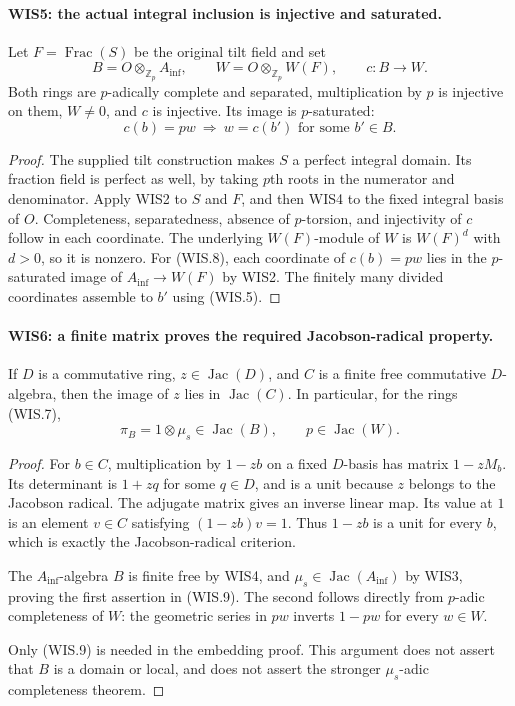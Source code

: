 \paragraph{WIS5: the actual integral inclusion is injective and saturated.}
\label{claim:WIS5}
Let $F=\operatorname{Frac}(S)$ be the original tilt field and set
\[
 B=O\otimes_{\mathbb Z_p}A_{\inf},\qquad
 W=O\otimes_{\mathbb Z_p}W(F),\qquad c:B\longrightarrow W.
                                                               \tag{WIS.7}
\]
Both rings are $p$-adically complete and separated, multiplication
by $p$ is injective on them, $W\ne0$, and $c$ is injective.
Its image is $p$-saturated:
\[
                  c(b)=pw\ \Longrightarrow\
                        w=c(b')\text{ for some }b'\in B.   \tag{WIS.8}
\]

\begin{proof}
The supplied tilt construction makes $S$ a perfect integral
domain. Its fraction field is perfect as well, by taking
$p$th roots in the numerator and denominator. Apply WIS2
to $S$ and $F$, and then WIS4 to the fixed integral basis
of $O$. Completeness, separatedness, absence of $p$-torsion,
and injectivity of $c$ follow in each coordinate.
The underlying $W(F)$-module of $W$ is $W(F)^d$ with
$d>0$, so it is nonzero. For (WIS.8), each coordinate
of $c(b)=pw$ lies in the $p$-saturated image of
$A_{\inf}\to W(F)$ by WIS2. The finitely many divided
coordinates assemble to $b'$ using (WIS.5).
\end{proof}

\paragraph{WIS6: a finite matrix proves the required Jacobson-radical property.}
\label{claim:WIS6}
If $D$ is a commutative ring, $z\in\operatorname{Jac}(D)$,
and $C$ is a finite free commutative $D$-algebra, then
the image of $z$ lies in $\operatorname{Jac}(C)$. In particular,
for the rings (WIS.7),
\[
             \pi_B=1\otimes\mu_s\in\operatorname{Jac}(B),
             \qquad p\in\operatorname{Jac}(W).             \tag{WIS.9}
\]

\begin{proof}
For $b\in C$, multiplication by $1-zb$ on a fixed $D$-basis
has matrix $1-zM_b$. Its determinant is $1+zq$ for some
$q\in D$, and is a unit because $z$ belongs to the Jacobson
radical. The adjugate matrix gives an inverse linear map.
Its value at $1$ is an element $v\in C$ satisfying
$(1-zb)v=1$. Thus $1-zb$ is a unit for every $b$, which
is exactly the Jacobson-radical criterion.

The $A_{\inf}$-algebra $B$ is finite free by WIS4, and
$\mu_s\in\operatorname{Jac}(A_{\inf})$ by WIS3, proving
the first assertion in (WIS.9). The second follows directly
from $p$-adic completeness of $W$: the geometric series
in $pw$ inverts $1-pw$ for every $w\in W$.

Only (WIS.9) is needed in the embedding proof. This argument
does not assert that $B$ is a domain or local, and does not
assert the stronger $\mu_s$-adic completeness theorem.
\end{proof}

